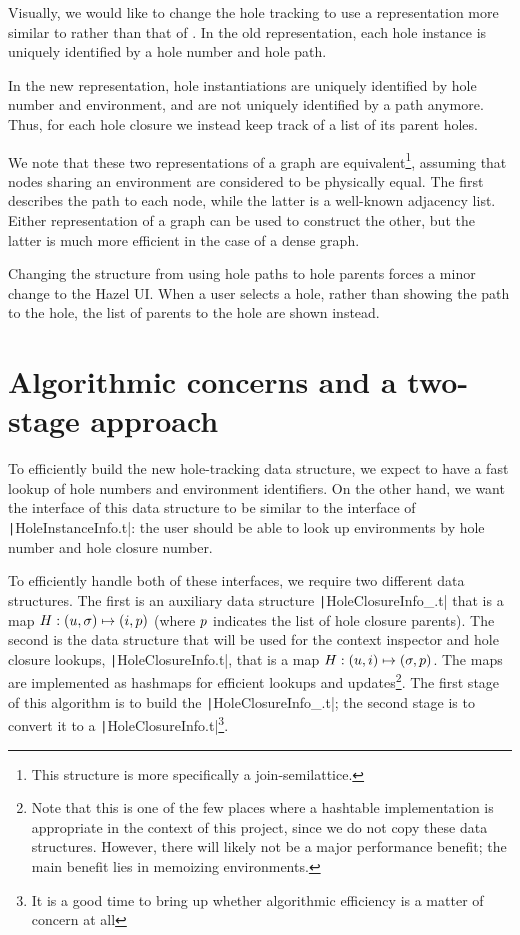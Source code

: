 Visually, we would like to change the hole tracking to use a representation more similar to  rather than that of . In the old representation, each hole instance is uniquely identified by a hole number and hole path.

In the new representation, hole instantiations are uniquely identified by hole number and environment, and are not uniquely identified by a path anymore. Thus, for each hole closure we instead keep track of a list of its parent holes.

We note that these two representations of a graph are equivalent\footnote{This structure is more specifically a join-semilattice.}, assuming that nodes sharing an environment are considered to be physically equal. The first describes the path to each node, while the latter is a well-known adjacency list. Either representation of a graph can be used to construct the other, but the latter is much more efficient in the case of a dense graph.

Changing the structure from using hole paths to hole parents forces a minor change to the Hazel UI. When a user selects a hole, rather than showing the path to the hole, the list of parents to the hole are shown instead.

\section{Algorithmic concerns and a two-stage approach}
\label{sec:two-stage-renumber}

To efficiently build the new hole-tracking data structure, we expect to have a fast lookup of hole numbers and environment identifiers. On the other hand, we want the interface of this data structure to be similar to the interface of \texttt|HoleInstanceInfo.t|: the user should be able to look up environments by hole number and hole closure number.

To efficiently handle both of these interfaces, we require two different data structures. The first is an auxiliary data structure \texttt|HoleClosureInfo_.t| that is a map $H:(u,\sigma)\mapsto(i,p)$ (where $p$ indicates the list of hole closure parents). The second is the data structure that will be used for the context inspector and hole closure lookups, \texttt|HoleClosureInfo.t|, that is a map $H:(u,i)\mapsto(\sigma,p)$. The maps are implemented as hashmaps for efficient lookups and updates\footnote{Note that this is one of the few places where a hashtable implementation is appropriate in the context of this project, since we do not copy these data structures. However, there will likely not be a major performance benefit; the main benefit lies in memoizing environments.}. The first stage of this algorithm is to build the \texttt|HoleClosureInfo_.t|; the second stage is to convert it to a \texttt|HoleClosureInfo.t|\footnote{It is a good time to bring up whether algorithmic efficiency is a matter of concern at all }.

